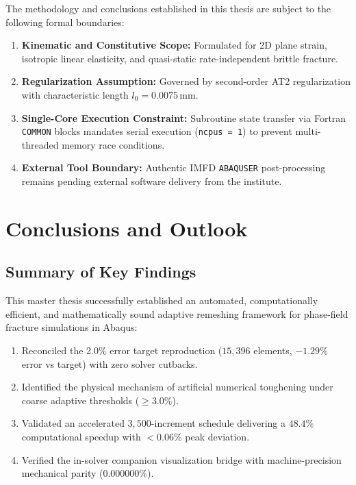 \documentclass[11pt,a4paper]{report}
\begin{document}
The methodology and conclusions established in this thesis are subject to the following formal boundaries:
\begin{enumerate}
    \item \textbf{Kinematic and Constitutive Scope:} Formulated for 2D plane strain, isotropic linear elasticity, and quasi-static rate-independent brittle fracture.
    \item \textbf{Regularization Assumption:} Governed by second-order AT2 regularization with characteristic length $l_0 = 0.0075\,\mathrm{mm}$.
    \item \textbf{Single-Core Execution Constraint:} Subroutine state transfer via Fortran \texttt{COMMON} blocks mandates serial execution (\texttt{ncpus = 1}) to prevent multi-threaded memory race conditions.
    \item \textbf{External Tool Boundary:} Authentic IMFD \texttt{ABAQUSER} post-processing remains pending external software delivery from the institute.
\end{enumerate}

\chapter{Conclusions and Outlook}
\label{chap:conclusions}

\section{Summary of Key Findings}
This master thesis successfully established an automated, computationally efficient, and mathematically sound adaptive remeshing framework for phase-field fracture simulations in Abaqus:
\begin{enumerate}
    \item Reconciled the 2.0\% error target reproduction ($15{,}396$ elements, $-1.29\%$ error vs target) with zero solver cutbacks.
    \item Identified the physical mechanism of artificial numerical toughening under coarse adaptive thresholds ($\ge 3.0\%$).
    \item Validated an accelerated $3{,}500$-increment schedule delivering a $48.4\%$ computational speedup with $<0.06\%$ peak deviation.
    \item Verified the in-solver companion visualization bridge with machine-precision mechanical parity ($0.000000\%$).
\end{enumerate}
\end{document}
